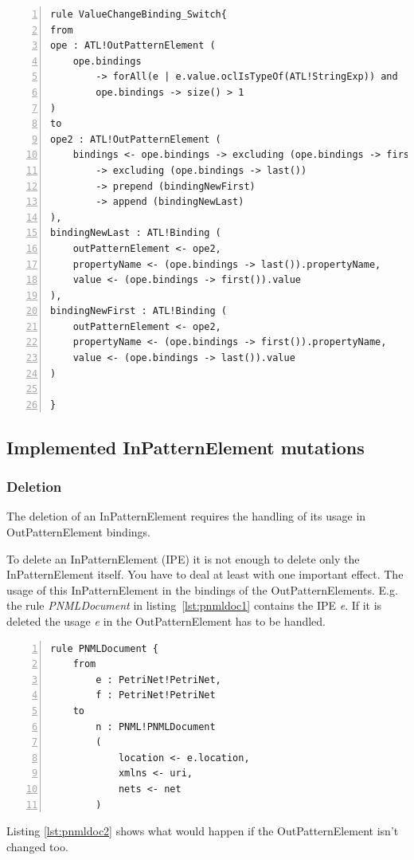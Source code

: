 \documentclass{llncs}
\begin{document}
\begin{lstlisting}[language=ATL, numbers=left,xleftmargin=5.0ex, caption=ValueChangeBinding-Definition using values from input models., label=lst:2ndOrderHOT]
rule ValueChangeBinding_Switch{
from
ope : ATL!OutPatternElement (
	ope.bindings 
		-> forAll(e | e.value.oclIsTypeOf(ATL!StringExp)) and
		ope.bindings -> size() > 1
)
to
ope2 : ATL!OutPatternElement (
	bindings <- ope.bindings -> excluding (ope.bindings -> first()) 
		-> excluding (ope.bindings -> last())
		-> prepend (bindingNewFirst)
		-> append (bindingNewLast)
), 
bindingNewLast : ATL!Binding (
	outPatternElement <- ope2, 
	propertyName <- (ope.bindings -> last()).propertyName,
	value <- (ope.bindings -> first()).value
),
bindingNewFirst : ATL!Binding (
	outPatternElement <- ope2,
	propertyName <- (ope.bindings -> first()).propertyName,
	value <- (ope.bindings -> last()).value	
)
	
}
\end{lstlisting}

\subsection{Implemented InPatternElement mutations}

\subsubsection{Deletion}

The deletion of an InPatternElement requires the handling of its usage in OutPatternElement bindings.

To delete an InPatternElement (IPE) it is not enough to delete only the InPatternElement itself. You have to deal at least with one important effect. The usage of this InPatternElement in the bindings of the OutPatternElements. E.g. the rule \emph{PNMLDocument} in listing~\ref{lst:pnmldoc1} contains the IPE \emph{e}. If it is deleted the usage \emph{e} in the OutPatternElement has to be handled.


\begin{lstlisting}[language=ATL, numbers=left,xleftmargin=5.0ex,label=lst:pnmldoc1, caption=Rule with 2 existing IPEs]
rule PNMLDocument {
	from
		e : PetriNet!PetriNet,
		f : PetriNet!PetriNet
	to	
		n : PNML!PNMLDocument
		(
			location <- e.location,
			xmlns <- uri,
			nets <- net			
		)
\end{lstlisting}

Listing \ref{lst:pnmldoc2} shows what would happen if the OutPatternElement isn't changed too.
\end{document}
